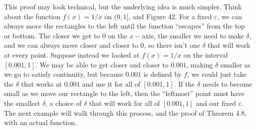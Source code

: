 \documentclass{article}
\theoremstyle{definition}
\begin{document}
	This proof may look technical, but the underlying idea is much simpler. Think about the function $ f(x)=1/x $ on $ (0,1] $, and Figure 42. For a fixed $ \varepsilon $, we can always move the rectangles to the left until the function ``escapes'' from the top or bottom. The closer we get to $ 0 $ on the $ x -$axis, the smaller we need to make $ \delta $, and we can always move closer and closer to $ 0 $, so there isn't one $ \delta $ that will work at every point. Suppose instead we looked at $ f(x)=1/x $ on the interval $ [0.001,1] $. We may be able to get closer and closer to $ 0.001 $, making $ \delta $ smaller as we go to satisfy continuity, but because $ 0.001 $ is defined by $ f $, we could just take the $ \delta $ that works at $ 0.001 $ and use it for all of $ [0.001,1] $. If the $ \delta $ needs to become small as we move our rectangle to the left, then the ``leftmost'' point must have the smallest $ \delta $, a choice of $ \delta $ that will work for all of $ [0.001,1] $ and our fixed $ \varepsilon $. The next example will walk through this process, and the proof of Theorem 4.8, with an actual function. 
\end{document}
